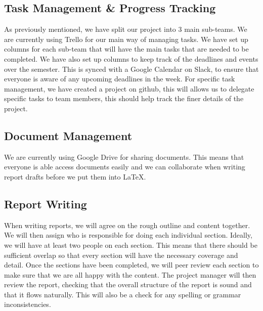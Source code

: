     \subsection{Task Management \& Progress Tracking}
    As previously mentioned, we have split our project into 3 main sub-teams. We are currently using Trello for our main way of managing tasks. We have set up columns for each sub-team that will have the main tasks that are needed to be completed. We have also set up columns to keep track of the deadlines and events over the semester. This is synced with a Google Calendar on Slack, to ensure that everyone is aware of any upcoming deadlines in the week. For specific task management, we have created a project on github, this will allows us to delegate specific tasks to team members, this should help track the finer details of the project. 
    
    \subsection{Document Management}
    
    We are currently using Google Drive for sharing documents. This means that everyone is able access documents easily and we can collaborate when writing report drafts before we put them into \LaTeX.
   
    \subsection{Report Writing}
    When writing reports, we will agree on the rough outline and content together. We will then assign who is responsible for doing each individual section. Ideally, we will have at least two people on each section. This means that there should be sufficient overlap so that every section will have the necessary coverage and detail. Once the sections have been completed, we will peer review each section to make sure that we are all happy with the content. The project manager will then review the report, checking that the overall structure of the report is sound and that it flows naturally. This will also be a check for any spelling or grammar inconsistencies.



